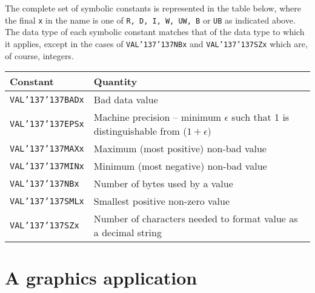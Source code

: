\documentclass[twoside,11pt]{article}
\renewcommand{\_}{{\tt\char'137}}
\newcommand{\xlabel}[1]{}
\begin{document}
The complete set of symbolic constants is represented in the table below,
where the final {\tt x}  in the name is one of
{\tt R, D, I, W, UW, B} or {\tt UB}  as indicated above.
The data type of each symbolic constant matches that of the
data type to which it applies, except in the cases of
{\tt VAL\_\_NBx} and {\tt VAL\_\_SZx} which are, of course, integers.
\begin{center}
\begin{tabular}{|l|l|} \hline
{\bf Constant   }& {\bf Quantity }\\ \hline
{\tt VAL\_\_BADx}        & Bad data value\\
{\tt VAL\_\_EPSx}        & Machine precision -- minimum $\epsilon$ such that
1 is distinguishable from ($1+\epsilon)$\\
{\tt VAL\_\_MAXx}        & Maximum (most positive) non-bad value\\
{\tt VAL\_\_MINx}        & Minimum (most negative) non-bad value\\
{\tt VAL\_\_NBx}         & Number of bytes used by a value\\
{\tt VAL\_\_SMLx}        & Smallest positive non-zero value\\
{\tt VAL\_\_SZx}         & Number of characters needed to format value as a decimal string\\
\hline
\end{tabular}
\end{center}

\newpage
\section{A graphics application\label{graph}\xlabel{a_graphics_application}}
\end{document}
